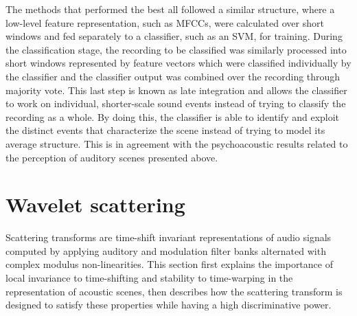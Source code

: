 \documentclass[journal]{IEEEtran}
\newcommand{\gl}[1]{\textcolor{red}{Gr\'egoire : #1}}
\newcommand{\ja}[1]{\textcolor{magenta}{Joakim : #1}}
\begin{document}
The methods that performed the best all followed a similar structure, where a low-level feature representation, such as MFCCs, were calculated over short windows and fed separately to a classifier, such as an SVM, for training. During the classification stage, the recording to be classified was similarly processed into short windows represented by feature vectors which were classified individually by the classifier and the classifier output was combined over the recording through majority vote. This last step is known as late integration and allows the classifier to work on individual, shorter-scale sound events instead of trying to classify the recording as a whole. By doing this, the classifier is able to identify and exploit the distinct events that characterize the scene instead of trying to model its average structure. This is in agreement with the psychoacoustic results related to the perception of auditory scenes presented above.





\section{Wavelet scattering \label{sec:scattering}}

Scattering transforms are time-shift invariant representations of audio signals computed by applying auditory and modulation filter banks alternated with complex modulus non-linearities.
This section first explains the importance of local invariance to time-shifting and stability to time-warping in the representation of acoustic scenes, then describes how the scattering transform is designed to satisfy these properties while having a high discriminative power.
\end{document}
